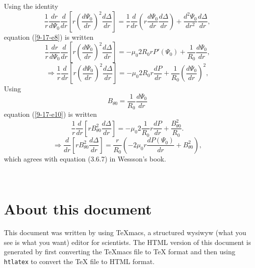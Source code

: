 \documentclass{article}
\newcommand{\code}[1]{\texttt{#1}}
\begin{document}
Using the identity
\begin{equation}
  \frac{1}{r}  \frac{d r}{d \Psi_0}  \frac{d}{d r} \left[ r \left( \frac{d
  \Psi_0}{d r} \right)^2 \frac{d \Delta}{d r} \right] = \frac{1}{r} 
  \frac{d}{d r} \left( r \frac{d \Psi_0}{d r}  \frac{d \Delta}{d r}  \right) +
  \frac{d^2 \Psi_0}{d r^2}  \frac{d \Delta}{d r},
\end{equation}
equation (\ref{9-17-e8}) is written
\begin{equation}
  \frac{1}{r}  \frac{d r}{d \Psi_0}  \frac{d}{d r} \left[ r \left( \frac{d
  \Psi_0}{d r} \right)^2 \frac{d \Delta}{d r} \right] = - \mu_0 2 R_0 r P'
  (\Psi_0) + \frac{1}{R_0}  \frac{d \Psi_0}{d r},
\end{equation}
\begin{equation}
  \label{9-17-e10} \Rightarrow \frac{1}{r}  \frac{d}{d r} \left[ r \left(
  \frac{d \Psi_0}{d r} \right)^2 \frac{d \Delta}{d r} \right] = - \mu_0 2 R_0
  r \frac{d P}{d r} + \frac{1}{R_0} \left(  \frac{d \Psi_0}{d r} \right)^2,
\end{equation}
Using
\begin{equation}
  B_{\theta 0} = \frac{1}{R_0}  \frac{d \Psi_0}{d r}
\end{equation}
equation (\ref{9-17-e10}) is written
\begin{equation}
  \frac{1}{r}  \frac{d}{d r} \left[ r B_{\theta 0}^2 \frac{d \Delta}{d r}
  \right] = - \mu_0 2 \frac{1}{R_0} r \frac{d P}{d r} + \frac{B_{\theta
  0}^2}{R_0} .
\end{equation}
\begin{equation}
  \Rightarrow \frac{d}{d r} \left[ r B_{\theta 0}^2 \frac{d \Delta}{d r}
  \right] = \frac{r}{R_0} \left( - 2 \mu_0 r \frac{d P (\Psi_0)}{d r} +
  B_{\theta 0}^2 \right),
\end{equation}
which agrees with equation (3.6.7) in Wessson's book{\cite{wesson2004}}.

\

\section{About this document}

This document was written by using TeXmacs{\cite{texmacs}}, a structured
wysiwyw (what you see is what you want) editor for scientists. The HTML
version of this document is generated by first converting the TeXmacs file to
TeX format and then using {\code{htlatex}} to convert the TeX file to HTML
format.
\end{document}
